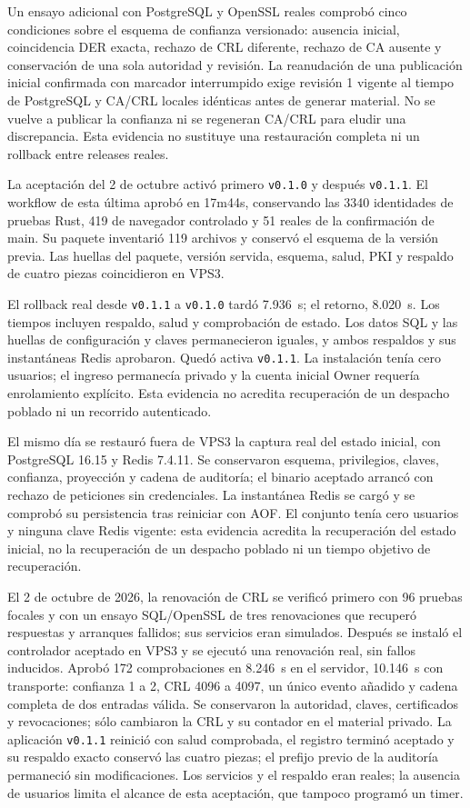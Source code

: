Un ensayo adicional con PostgreSQL y OpenSSL reales comprobó cinco condiciones
sobre el esquema de confianza versionado: ausencia inicial, coincidencia DER
exacta, rechazo de CRL diferente, rechazo de CA ausente y conservación de una
sola autoridad y revisión. La reanudación de una publicación inicial confirmada
con marcador interrumpido exige revisión 1 vigente al tiempo de PostgreSQL y
CA/CRL locales idénticas antes de generar material. No se vuelve a publicar
la confianza ni se regeneran CA/CRL para eludir una discrepancia. Esta evidencia
no sustituye una restauración completa ni un rollback entre releases reales.


La aceptación del 2 de octubre activó primero \texttt{v0.1.0} y después
\texttt{v0.1.1}. El workflow de esta última aprobó en 17m44s, conservando las
3340 identidades de pruebas Rust, 419 de navegador controlado y 51 reales de
la confirmación de main. Su paquete inventarió 119 archivos y conservó el
esquema de la versión previa. Las huellas del paquete, versión servida, esquema,
salud, PKI y respaldo de cuatro piezas coincidieron en VPS3.

El rollback real desde \texttt{v0.1.1} a \texttt{v0.1.0} tardó 7.936~s;
el retorno, 8.020~s. Los tiempos incluyen respaldo, salud y comprobación de
estado. Los datos SQL y las huellas de configuración y claves permanecieron
iguales, y ambos respaldos y sus instantáneas Redis aprobaron. Quedó activa
\texttt{v0.1.1}. La instalación tenía cero usuarios; el ingreso permanecía
privado y la cuenta inicial Owner requería enrolamiento explícito. Esta
evidencia no acredita recuperación de un despacho poblado ni un recorrido
autenticado.

El mismo día se restauró fuera de VPS3 la captura real del estado inicial, con
PostgreSQL 16.15 y Redis 7.4.11. Se conservaron esquema, privilegios, claves,
confianza, proyección y cadena de auditoría; el binario aceptado arrancó con
rechazo de peticiones sin credenciales. La instantánea Redis se cargó y se
comprobó su persistencia tras reiniciar con AOF. El conjunto tenía cero usuarios
y ninguna clave Redis vigente: esta evidencia acredita la recuperación del
estado inicial, no la recuperación de un despacho poblado ni un tiempo objetivo
de recuperación.


El 2 de octubre de 2026, la renovación de CRL se verificó primero con 96 pruebas
focales y con un ensayo SQL/OpenSSL de tres renovaciones que recuperó respuestas
y arranques fallidos; sus servicios eran simulados. Después se instaló el
controlador aceptado en VPS3 y se ejecutó una renovación real, sin fallos
inducidos. Aprobó 172 comprobaciones en 8.246~s en el servidor, 10.146~s con
transporte: confianza 1 a 2, CRL 4096 a 4097, un único evento añadido y cadena
completa de dos entradas válida. Se conservaron la autoridad, claves,
certificados y revocaciones; sólo cambiaron la CRL y su contador en el material
privado. La aplicación \texttt{v0.1.1} reinició con salud comprobada, el registro
terminó aceptado y su respaldo exacto conservó las cuatro piezas; el prefijo
previo de la auditoría permaneció sin modificaciones. Los servicios y el
respaldo eran reales; la ausencia de usuarios limita el alcance de esta
aceptación, que tampoco programó un timer.


